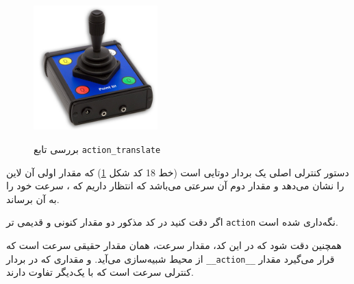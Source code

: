 \newlinef
\begin{figure}
\begin{minipage}{4.8cm}
\centering
\includegraphics[width=4.8cm]{Figures/joystick}
\label{fig:joystick}
\newline
{}
\end{minipage}
\hspace*{0.5cm}
\begin{minipage}{10cm}
\end{minipage}
\caption{بررسی تابع \texttt{action\_translate}}
\label{fig:minipage-joystick}
\end{figure}

\begin{note}
	دستور کنترلی اصلی یک بردار دوتایی است (خط  18 کد شکل \ref{fig:minipage-joystick}) که مقدار اولی آن لاین را نشان می‌دهد و مقدار دوم آن سرعتی می‌باشد که انتظار داریم که ، سرعت خود را به آن برساند. 
\end{note}
\begin{note}
	اگر دقت کنید در کد مذکور دو مقدار کنونی و قدیمی تر \texttt{action} نگه‌داری شده است.
\end{note}
\begin{note}
	همچنین دقت شود که در این کد، مقدار سرعت، همان مقدار حقیقی سرعت است که از محیط شبیه‌سازی می‌آید. و مقداری که در بردار \texttt{\_\_action\_\_} قرار می‌گیرد مقدار کنترلی سرعت است که با یک‌دیگر تفاوت دارند.
\end{note}


